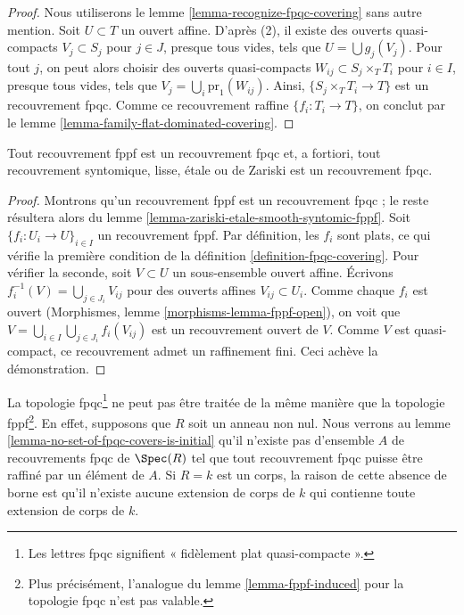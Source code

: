 \begin{proof}
Nous utiliserons le lemme \ref{lemma-recognize-fpqc-covering} sans autre
mention. Soit $U \subset T$ un ouvert affine. D'après (2), il existe
des ouverts quasi-compacts $V_j \subset S_j$ pour $j \in J$, presque tous vides, tels que
$U = \bigcup g_j(V_j)$. Pour tout $j$, on peut alors choisir des ouverts quasi-compacts
$W_{ij} \subset S_j \times_T T_i$ pour $i \in I$, presque tous vides,
tels que $V_j = \bigcup_i \text{pr}_1(W_{ij})$. Ainsi,
$\{S_j \times_T T_i \to T\}$ est un recouvrement fpqc.
Comme ce recouvrement raffine $\{f_i : T_i \to T\}$, on conclut par le
lemme \ref{lemma-family-flat-dominated-covering}.
\end{proof}

\begin{lemma}
\label{lemma-zariski-etale-smooth-syntomic-fppf-fpqc}
Tout recouvrement fppf est un recouvrement fpqc et, a fortiori,
tout recouvrement syntomique, lisse, \'etale ou de Zariski est un recouvrement fpqc.
\end{lemma}

\begin{proof}
Montrons qu'un recouvrement fppf est un recouvrement fpqc ; le
reste résultera alors du
lemme \ref{lemma-zariski-etale-smooth-syntomic-fppf}.
Soit $\{f_i : U_i \to U\}_{i \in I}$ un recouvrement fppf.
Par définition, les $f_i$ sont plats, ce qui vérifie la première
condition de la définition \ref{definition-fpqc-covering}. Pour vérifier la
seconde, soit $V \subset U$ un sous-ensemble ouvert affine.
Écrivons $f_i^{-1}(V) = \bigcup_{j \in J_i} V_{ij}$
pour des ouverts affines $V_{ij} \subset U_i$. Comme chaque $f_i$ est ouvert
(Morphismes, lemme \ref{morphisms-lemma-fppf-open}), on voit que
$V = \bigcup_{i\in I} \bigcup_{j \in J_i} f_i(V_{ij})$
est un recouvrement ouvert de $V$.
Comme $V$ est quasi-compact, ce recouvrement admet un
raffinement fini. Ceci achève la démonstration.
\end{proof}

\noindent
La topologie fpqc\footnote{Les lettres fpqc signifient
« fid\`element plat quasi-compacte ».}
ne peut pas être traitée de la même manière que la topologie
fppf\footnote{Plus précisément, l'analogue du
lemme \ref{lemma-fppf-induced} pour la topologie fpqc n'est pas valable.}.
En effet, supposons que $R$ soit un anneau non nul. Nous verrons au
lemme \ref{lemma-no-set-of-fpqc-covers-is-initial}
qu'il n'existe pas d'ensemble $A$ de recouvrements fpqc de $\Spec(R)$
tel que tout recouvrement fpqc puisse être raffiné par un élément de $A$.
Si $R = k$ est un corps, la raison de cette absence de borne est
qu'il n'existe aucune extension de corps de $k$ qui contienne toute extension de corps
de $k$.

